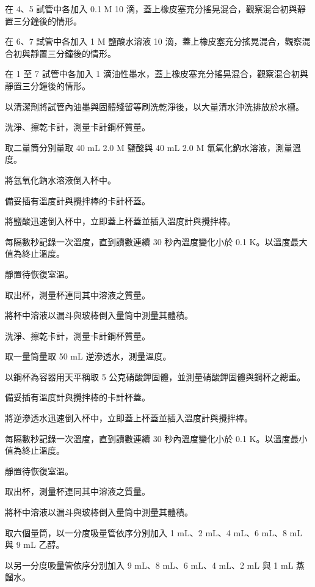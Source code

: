 \documentclass[a4paper,12pt]{article}
\begin{document}
\item 在 4、5 試管中各加入 0.1 M  10 滴，蓋上橡皮塞充分搖晃混合，觀察混合初與靜置三分鐘後的情形。
\item 在 6、7 試管中各加入 1 M 鹽酸水溶液 10 滴，蓋上橡皮塞充分搖晃混合，觀察混合初與靜置三分鐘後的情形。
\item 在 1 至 7 試管中各加入 1 滴油性墨水，蓋上橡皮塞充分搖晃混合，觀察混合初與靜置三分鐘後的情形。
\item 以清潔劑將試管內油墨與固體殘留等刷洗乾淨後，以大量清水沖洗排放於水槽。
\een
{}
\ben
\item 洗淨、擦乾卡計，測量卡計鋼杯質量。
\item 取二量筒分別量取 40 mL 2.0 M 鹽酸與 40 mL 2.0 M 氫氧化鈉水溶液，測量溫度。
\item 將氫氧化鈉水溶液倒入杯中。
\item 備妥插有溫度計與攪拌棒的卡計杯蓋。
\item 將鹽酸迅速倒入杯中，立即蓋上杯蓋並插入溫度計與攪拌棒。
\item 每隔數秒記錄一次溫度，直到讀數連續 30 秒內溫度變化小於 0.1 K。以溫度最大值為終止溫度。
\item 靜置待恢復室溫。
\item 取出杯，測量杯連同其中溶液之質量。
\item 將杯中溶液以漏斗與玻棒倒入量筒中測量其體積。
\een
{}
\ben
\item 洗淨、擦乾卡計，測量卡計鋼杯質量。
\item 取一量筒量取 50 mL 逆滲透水，測量溫度。
\item 以鋼杯為容器用天平稱取 5 公克硝酸鉀固體，並測量硝酸鉀固體與鋼杯之總重。
\item 備妥插有溫度計與攪拌棒的卡計杯蓋。
\item 將逆滲透水迅速倒入杯中，立即蓋上杯蓋並插入溫度計與攪拌棒。
\item 每隔數秒記錄一次溫度，直到讀數連續 30 秒內溫度變化小於 0.1 K。以溫度最小值為終止溫度。
\item 靜置待恢復室溫。
\item 取出杯，測量杯連同其中溶液之質量。
\item 將杯中溶液以漏斗與玻棒倒入量筒中測量其體積。
\een
{}
\ben
\item 取六個量筒，以一分度吸量管依序分別加入 1 mL、2 mL、4 mL、6 mL、8 mL 與 9 mL 乙醇。
\item 以另一分度吸量管依序分別加入 9 mL、8 mL、6 mL、4 mL、2 mL 與 1 mL 蒸餾水。
\end{document}
